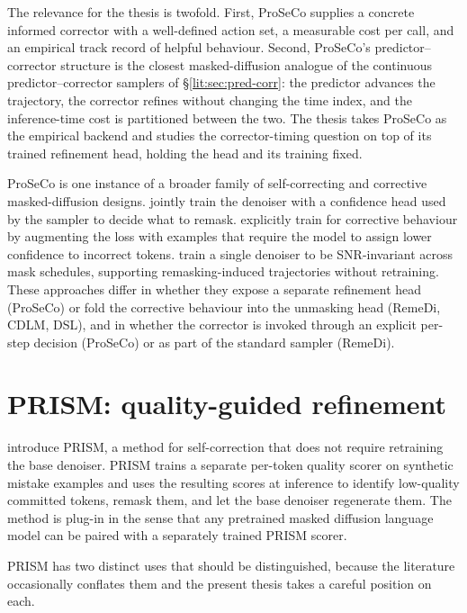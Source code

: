 The relevance for the thesis is twofold. First, ProSeCo supplies a concrete
informed corrector with a well-defined action set, a measurable cost per
call, and an empirical track record of helpful behaviour. Second,
ProSeCo's predictor--corrector structure is the closest masked-diffusion
analogue of the continuous predictor--corrector samplers of
\S\ref{lit:sec:pred-corr}: the predictor advances the trajectory, the
corrector refines without changing the time index, and the inference-time
cost is partitioned between the two. The thesis takes ProSeCo as the
empirical backend and studies the corrector-timing question on top of its
trained refinement head, holding the head and its training fixed.

ProSeCo is one instance of a broader family of self-correcting and
corrective masked-diffusion designs. \textcite{huang2025remedi} jointly
train the denoiser with a confidence head used by the sampler to decide
what to remask. \textcite{zhang2026cdlm} explicitly train for corrective
behaviour by augmenting the loss with examples that require the model to
assign lower confidence to incorrect tokens. \textcite{wu2026dsl} train a
single denoiser to be SNR-invariant across mask schedules, supporting
remasking-induced trajectories without retraining. These approaches differ
in whether they expose a separate refinement head (ProSeCo) or fold the
corrective behaviour into the unmasking head (RemeDi, CDLM, DSL), and in
whether the corrector is invoked through an explicit per-step decision
(ProSeCo) or as part of the standard sampler (RemeDi).

\section{PRISM: quality-guided refinement}
\label{lit:sec:prism}

\textcite{kim2025prism} introduce PRISM, a method for self-correction that
does not require retraining the base denoiser. PRISM trains a separate
per-token quality scorer on synthetic mistake examples and uses the
resulting scores at inference to identify low-quality committed tokens,
remask them, and let the base denoiser regenerate them. The method is
plug-in in the sense that any pretrained masked diffusion language model
can be paired with a separately trained PRISM scorer.

PRISM has two distinct uses that should be distinguished, because the
literature occasionally conflates them and the present thesis takes a
careful position on each.

